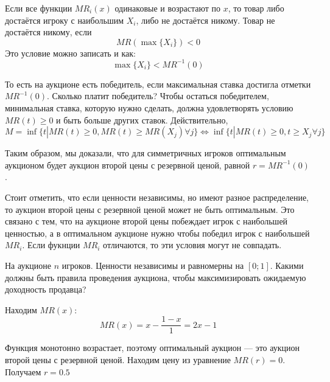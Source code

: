 \begin{myex} Если все функции $ MR_{i}(x) $ одинаковые и возрастают по $ x $, то товар либо достаётся игроку с наибольшим $ X_{i} $, либо не достаётся никому. Товар не достаётся никому, если
\begin{equation}
MR(\max\{X_{i}\})<0
\end{equation}
Это условие можно записать и как:
\begin{equation}
\max\{X_{i}\}<MR^{-1}(0)
\end{equation}

То есть на аукционе есть победитель, если максимальная ставка достигла отметки $ MR^{-1}(0) $. Сколько платит победитель? Чтобы остаться победителем, минимальная ставка, которую нужно сделать, должна удовлетворять условию $ MR(t)\geq 0 $ и быть больше других ставок. Действительно,
\begin{equation}
M=\inf\{ t| MR(t)\geq 0 , MR(t)\geq MR(X_{j}) \forall j \} \Longleftrightarrow \inf\{ t| MR(t)\geq 0 , t\geq X_{j} \forall j \}
\end{equation}

Таким образом, мы доказали, что для симметричных игроков оптимальным аукционом будет аукцион второй цены с резервной ценой, равной $ r=MR^{-1}(0) $.
\end{myex}


Стоит отметить, что если ценности независимы, но имеют разное распределение, то аукцион второй цены с резервной ценой может не быть оптимальным. Это связано с тем, что на аукционе второй цены побеждает игрок с наибольшей ценностью, а в оптимальном аукционе нужно чтобы победил игрок с наибольшей $ MR_{i} $. Если фукнции $ MR_{i} $ отличаются, то эти условия могут не совпадать.

\begin{myex} На аукционе $ n $ игроков. Ценности независимы и равномерны на $ [0;1] $. Какими должны быть правила проведения аукциона, чтобы максимизировать ожидаемую доходность продавца?

Находим $ MR(x)$:
\begin{equation}
MR(x)=x-\frac{1-x}{1}=2x-1
\end{equation}

Функция монотонно возрастает, поэтому оптимальный аукцион — это аукцион второй цены с резервной ценой. Находим цену из уравнение $ MR(r)=0 $. Получаем $ r=0.5 $
\end{myex}




